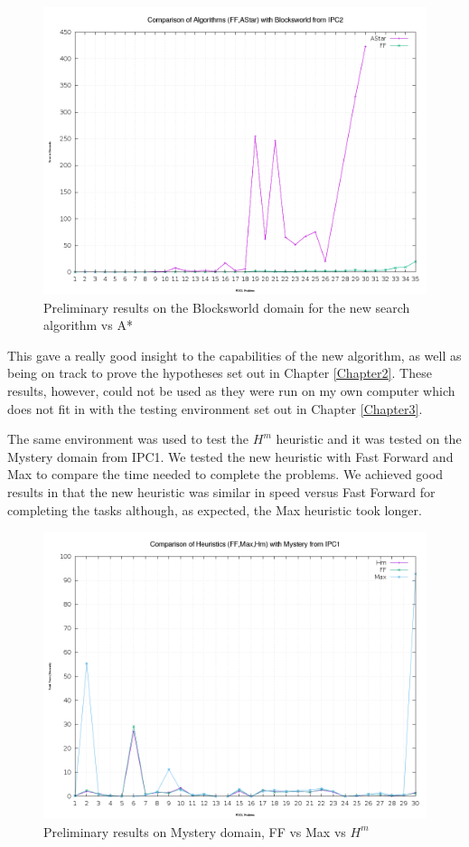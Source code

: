 \begin{figure}[!htb]
    \includegraphics[scale=0.35]{PrelimTestFF.png}
    \caption{Preliminary results on the Blocksworld domain for the new search algorithm vs A*}
    \label{fig:PrelimVsA*}   
\end{figure}

This gave a really good insight to the capabilities of the new algorithm, as well as being on track to prove the hypotheses set out in Chapter \ref{Chapter2}. These results, however, could not be used as they were run on my own computer which does not fit in with the testing environment set out in Chapter \ref{Chapter3}.

The same environment was used to test the $H^m$ heuristic and it was tested on the Mystery domain from IPC1. We tested the new heuristic with Fast Forward and Max to compare the time needed to complete the problems. We achieved good results in that the new heuristic was similar in speed versus Fast Forward for completing the tasks although, as expected, the Max heuristic took longer. 

\begin{figure}[!htb]
    \centering
    \includegraphics[scale=0.35]{PrelimTestHeuristic.png}
    \caption{Preliminary results on Mystery domain, FF vs Max vs $H^m$}
    \label{fig:PrelimFFvsMaxvsHm}
\end{figure}

